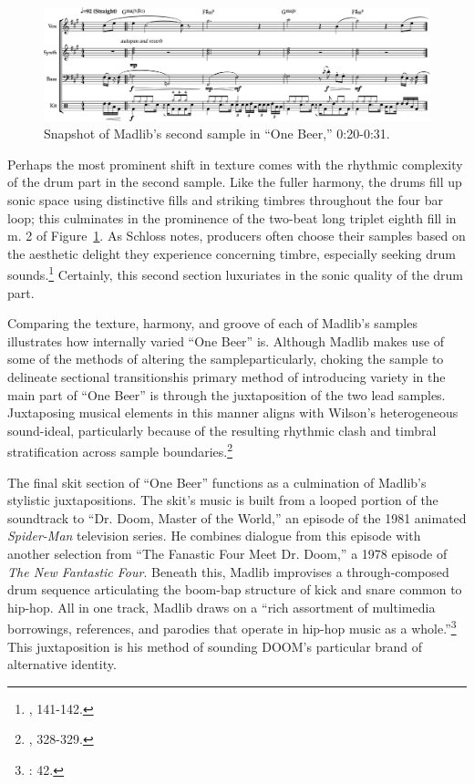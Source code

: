     \begin{figure}[ht]
        \centering
        \includegraphics[width=\textwidth]{images/figures/chp 02/020031onebeermain.pdf}
        \caption{Snapshot of Madlib's second sample in ``One Beer,'' 0:20-0:31.}
        \label{fig:onebeermain}
    \end{figure}

Perhaps the most prominent shift in texture comes with the rhythmic complexity of the drum part in the second sample. Like the fuller harmony, the drums fill up sonic space using distinctive fills and striking timbres throughout the four bar loop; this culminates in the prominence of the two-beat long triplet eighth fill in m. 2 of Figure~\ref{fig:onebeermain}. As Schloss notes, producers often choose their samples based on the aesthetic delight they experience concerning timbre, especially seeking drum sounds.\footnote{\cite{josephgschlossMakingBeatsArt2004}, 141-142.} Certainly, this second section luxuriates in the sonic quality of the drum part.

Comparing the texture, harmony, and groove of each of Madlib's samples illustrates how internally varied ``One Beer'' is. Although Madlib makes use of some of the methods of altering the sample\textemdash particularly, choking the sample to delineate sectional transitions\textemdash his primary method of introducing variety in the main part of ``One Beer'' is through the juxtaposition of the two lead samples. Juxtaposing musical elements in this manner aligns with Wilson's heterogeneous sound-ideal, particularly because of the resulting rhythmic clash and  timbral stratification across sample boundaries.\footnote{\cite{ollywilsonHeterogeneousSoundIdeal1992}, 328-329.}

The final skit section of ``One Beer'' functions as a culmination of Madlib's stylistic juxtapositions. The skit's music is built from a looped portion of the soundtrack to ``Dr. Doom, Master of the World,'' an episode of the 1981 animated \textit{Spider-Man} television series. He combines dialogue from this episode with another selection from ``The Fanastic Four Meet Dr. Doom,'' a 1978 episode of \textit{The New Fantastic Four}. Beneath this, Madlib improvises a through-composed drum sequence articulating the boom-bap structure of kick and snare common to hip-hop. All in one track, Madlib draws on a ``rich assortment of multimedia borrowings, references, and parodies that operate in hip-hop music as a whole.''\footnote{\cite{joannademersSampling1970sHipHop2003}: 42.} This juxtaposition is his method of sounding DOOM's particular brand of alternative identity.
